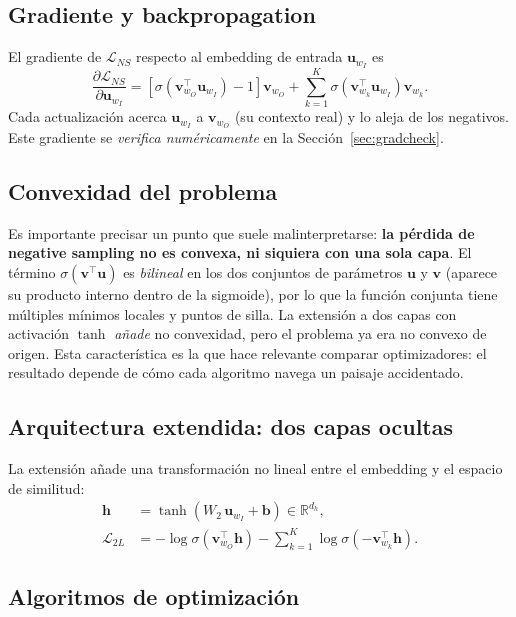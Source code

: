 \documentclass[11pt]{article}
\begin{document}
\subsection{Gradiente y backpropagation}
El gradiente de $\mathcal{L}_{NS}$ respecto al embedding de entrada $\mathbf{u}_{w_I}$ es
\begin{equation}\label{eq:grad}
\frac{\partial \mathcal{L}_{NS}}{\partial \mathbf{u}_{w_I}} =
\left[\sigma\!\left(\mathbf{v}_{w_O}^{\top}\mathbf{u}_{w_I}\right)-1\right]\mathbf{v}_{w_O}
+ \sum_{k=1}^{K}\sigma\!\left(\mathbf{v}_{w_k}^{\top}\mathbf{u}_{w_I}\right)\mathbf{v}_{w_k}.
\end{equation}
Cada actualización acerca $\mathbf{u}_{w_I}$ a $\mathbf{v}_{w_O}$ (su contexto real) y lo
aleja de los negativos. Este gradiente se \emph{verifica numéricamente} en la
Sección~\ref{sec:gradcheck}.

\subsection{Convexidad del problema}\label{sec:convexidad}
Es importante precisar un punto que suele malinterpretarse: \textbf{la pérdida de negative
sampling no es convexa, ni siquiera con una sola capa}. El término
$\sigma(\mathbf{v}^{\top}\mathbf{u})$ es \emph{bilineal} en los dos conjuntos de parámetros
$\mathbf{u}$ y $\mathbf{v}$ (aparece su producto interno dentro de la sigmoide), por lo que
la función conjunta tiene múltiples mínimos locales y puntos de silla. La extensión a dos
capas con activación $\tanh$ \emph{añade} no convexidad, pero el problema ya era no convexo
de origen. Esta característica es la que hace relevante comparar optimizadores: el resultado
depende de cómo cada algoritmo navega un paisaje accidentado.

\subsection{Arquitectura extendida: dos capas ocultas}
La extensión añade una transformación no lineal entre el embedding y el espacio de similitud:
\begin{align}
\mathbf{h} &= \tanh(W_2\,\mathbf{u}_{w_I}+\mathbf{b})\in\mathbb{R}^{d_h},\\
\mathcal{L}_{2L} &= -\log\sigma\!\left(\mathbf{v}_{w_O}^{\top}\mathbf{h}\right)
- \sum_{k=1}^{K}\log\sigma\!\left(-\mathbf{v}_{w_k}^{\top}\mathbf{h}\right).
\end{align}

\subsection{Algoritmos de optimización}
\end{document}
